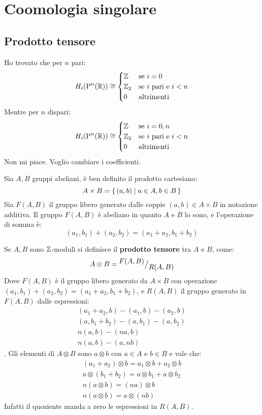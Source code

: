 \chapter{Coomologia singolare}


\section{Prodotto tensore}

Ho trovato che per $ n $ pari:
\[
  H_i(\mathrm{P}^n (\mathbb{R})) \cong
  \begin{cases}
    \mathbb{Z} & \text{se } i = 0 \\
    \mathbb{Z}_2 & \text{se $ i $ pari e $ i < n $} \\
    0 & \text{altrimenti}
  \end{cases}
\]
Mentre per $ n $ dispari:
\[
  H_i(\mathrm{P}^n (\mathbb{R})) \cong
  \begin{cases}
    \mathbb{Z} & \text{se } i = 0,n \\
    \mathbb{Z}_2 & \text{se $ i $ pari e $ i < n $} \\
    0 & \text{altrimenti}
  \end{cases}
\]
Non mi piace. Voglio cambiare i coefficienti.

Sia $ A, B $ gruppi abeliani, è ben definito il prodotto
cartesiano:
\[
  A \times B = \set{(a,b) | a \in A, b \in B}
\]
Sia $ F(A,B) $ il gruppo libero generato dalle coppie $ (a, b) \in A \times B $
in notazione additiva. Il gruppo $ F(A,B) $ è abeliano in quanto
$ A $ e $ B $ lo sono, e l'operazione di somma è:
\[
  (a_1, b_1 ) + (a_2, b_2) = (a_1 + a_2, b_1 + b_2)
\]
\begin{definition}
  Se $ A, B $ sono $ \mathbb{Z} $-moduli si definisce il \textbf{prodotto
    tensore} tra $ A $ e $ B $, come:
  \[
    A \otimes B = {^{\textstyle F(A,B)}\big/_{\textstyle R(A,B)}}
  \]
  Dove $ F(A,B) $ è il gruppo libero generato da $ A \times B $ con operazione
  $ (a_1, b_1) + (a_2, b_2) = (a_1 + a_2, b_1 + b_2) $, e $ R(A,B) $ il gruppo
  generato in $ F(A,B) $ dalle espressioni:
  \begin{gather*}
    (a_1 + a_2, b) - (a_1, b) - (a_2, b) \\
    (a, b_1 + b_2) - (a, b_1) - (a, b_2) \\
    n (a, b) - (na, b) \\
    n (a, b) - (a, nb)
  \end{gather*}.
  Gli elementi di $ A \otimes B $ sono $ a \otimes b $ con $ a \in A $ e $ b \in B $ e vale che:
  \begin{gather*}
    (a_1 + a_2) \otimes b = a_1 \otimes b + a_2 \otimes b \\
    a \otimes (b_1 + b_2) = a \otimes b_1 + a \otimes b_2 \\
    n (a \otimes b) = (na) \otimes b \\
    n (a \otimes b) = a \otimes (nb)
  \end{gather*}
  Infatti il quoziente manda a zero le espressioni in $ R(A,B) $.
\end{definition}

